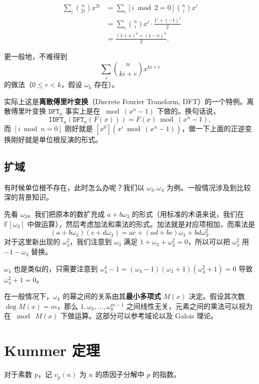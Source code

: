     \begin{solution}
        $$
        \begin{aligned}
        \sum_i \binom{n}{2i}x^{2i}&=\sum_i [i\bmod 2=0]\binom{n}{i}x^i\\
        &=\sum_{i}\binom{n}{i}x^i\cdot \frac{1^i+(-1)^i}{2}\\
        &=\frac{(1+x)^n+(1-x)^n}{2}.
        \end{aligned}
        $$

        更一般地，不难得到
        $$
        \sum_i \binom{n}{ki+r}x^{ki+r}
        $$
        的做法（$0\le r<k$，假设 $\omega_k$ 存在）。
    \end{solution}
    \begin{remark}
        实际上这是\textbf{离散傅里叶变换}（Discrete Fourier Transform, DFT）的一个特例。离散傅里叶变换 $\mathtt{DFT}_n$ 事实上是在 $\bmod (x^n-1)$ 下做的。换句话说，
    $$
    \mathtt{IDFT}_n(\mathtt{DFT}_n(F(x)))=F(x)\bmod(x^n-1),
    $$
    而 $[i\bmod n=0]$ 刚好就是 $[x^0](x^i\bmod(x^n-1))$，做一下上面的正逆变换刚好就是单位根反演的形式。
    \end{remark}
\subsection{扩域}
    有时候单位根不存在，此时怎么办呢？我们以 $\omega_3,\omega_4$ 为例。一般情况涉及到比较深的背景知识。

    先看 $\omega_3$。我们把原本的数扩充成 $a+b\omega_3$ 的形式（用标准的术语来说，我们在 $\mathbb F[\omega_3]$ 中做运算），然后考虑加法和乘法的形式。加法就是对应项相加，而乘法是
    $$
    (a+b\omega_3)(c+d\omega_3)=ac+(ad+bc)\omega_3+bd\omega_3^2.
    $$
    对于这里新出现的 $\omega_3^2$，我们注意到 $\omega_3$ 满足 $1+\omega_3+\omega_3^2=0$，所以可以把 $\omega_3^2$ 用 $-1-\omega_3$ 替换。

    $\omega_4$ 也是类似的，只需要注意到 $\omega_4^4-1=(\omega_4-1)(\omega_4+1)(\omega_4^2+1)=0$ 导致 $\omega_4^2+1=0$。
    
    在一般情况下，$\omega_k$ 的幂之间的关系由其\textbf{最小多项式} $M(x)$ 决定。假设其次数 $\deg M(x)=m$，那么 $1,\omega_k,\ldots,\omega_k^{m-1}$ 之间线性无关，元素之间的乘法可以视为在 $\bmod\ M(x)$ 下做运算。这部分可以参考域论以及 Galois 理论。
\section{Kummer 定理}
    对于素数 $p$，记 $v_p(n)$ 为 $n$ 的质因子分解中 $p$ 的指数。

